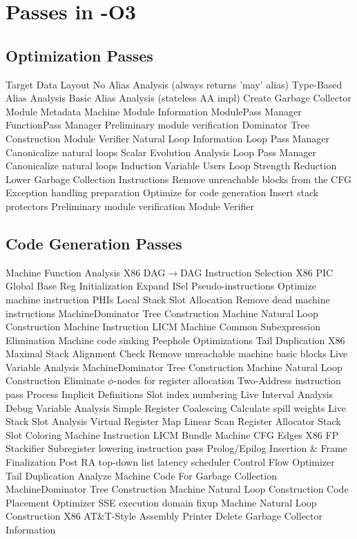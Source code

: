 \documentclass{myproc}
\begin{document}
\section{Passes in -O3}
\subsection{Optimization Passes}
\bit
\w Target Data Layout
\w No Alias Analysis (always returns 'may' alias)
\w Type-Based Alias Analysis
\w Basic Alias Analysis (stateless AA impl)
\w Create Garbage Collector Module Metadata
\w Machine Module Information
\w  ModulePass Manager
   \bit
   \w FunctionPass Manager
     \bit
     \w Preliminary module verification
     \w Dominator Tree Construction
     \w Module Verifier
     \w Natural Loop Information
     \w Loop Pass Manager
       \ben
       \w Canonicalize natural loops
       \een
     \w Scalar Evolution Analysis
     \w Loop Pass Manager
       \ben
       \w Canonicalize natural loops
       \w Induction Variable Users
       \w Loop Strength Reduction
       \een
     \w Lower Garbage Collection Instructions
     \w Remove unreachable blocks from the CFG
     \w Exception handling preparation
     \w Optimize for code generation
     \w Insert stack protectors
     \w Preliminary module verification
     \w Module Verifier
   \eit
  \eit
\eit
\subsection{Code Generation Passes}
\bit
\w Machine Function Analysis
\w X86 DAG$\rightarrow$DAG Instruction Selection
\w X86 PIC Global Base Reg Initialization
\w Expand ISel Pseudo-instructions
\w Optimize machine instruction PHIs
\w Local Stack Slot Allocation
\w Remove dead machine instructions
\w MachineDominator Tree Construction
\w Machine Natural Loop Construction
\w Machine Instruction LICM
\w Machine Common Subexpression Elimination
\w Machine code sinking
\w Peephole Optimizations
\w Tail Duplication
\w X86 Maximal Stack Alignment Check
\w Remove unreachable machine basic blocks
\w Live Variable Analysis
\w MachineDominator Tree Construction
\w Machine Natural Loop Construction
\w Eliminate $\phi$-nodes for register allocation
\w Two-Address instruction pass
\w Process Implicit Definitions
\w Slot index numbering
\w Live Interval Analysis
\w Debug Variable Analysis
\w Simple Register Coalescing
\w Calculate spill weights
\w Live Stack Slot Analysis
\w Virtual Register Map
\w Linear Scan Register Allocator
\w Stack Slot Coloring
\w Machine Instruction LICM
\w Bundle Machine CFG Edges
\w X86 FP Stackifier
\w Subregister lowering instruction pass
\w Prolog/Epilog Insertion \& Frame Finalization
\w Post RA top-down list latency scheduler
\w Control Flow Optimizer
\w Tail Duplication
\w Analyze Machine Code For Garbage Collection
\w MachineDominator Tree Construction
\w Machine Natural Loop Construction
\w Code Placement Optimizer
\w SSE execution domain fixup
\w Machine Natural Loop Construction
\w X86 AT\&T-Style Assembly Printer
\w Delete Garbage Collector Information
\eit
\end{document}
